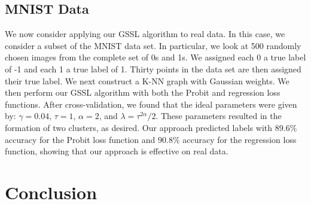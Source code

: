 \documentclass[12pt]{amsart}
\begin{document}
\subsection{MNIST Data}
We now consider applying our GSSL algorithm to real data. In this case, we consider a subset of the MNIST data set. In particular, we look at 500 randomly chosen images from the complete set of 0s and 1s. We assigned each 0 a true label of -1 and each 1 a true label of 1. Thirty points in the data set are then assigned their true label. We next construct a K-NN graph with Gaussian weights. We then perform our GSSL algorithm with both the Probit and regression loss functions. After cross-validation, we found that the ideal parameters were given by: $\gamma=0.04$, $\tau=1$, $\alpha=2$, and $\lambda=\tau^{2\alpha}/2$. These parameters resulted in the formation of two clusters, as desired. Our approach predicted labels with $89.6\%$ accuracy for the Probit loss function and $90.8\%$ accuracy for the regression loss function, showing that our approach is effective on real data.

\section{Conclusion}

\nocite{hoffmann, borovitskiy, sanz-alonso}


\end{document}
